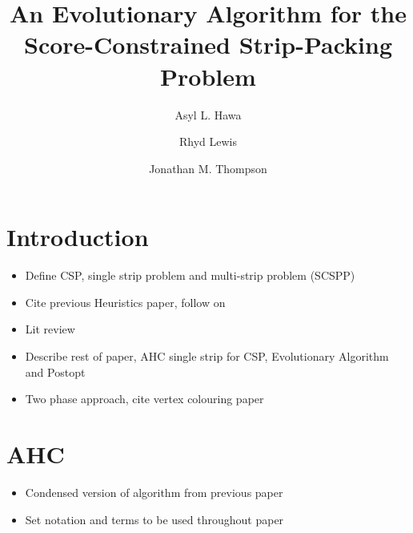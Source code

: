 \documentclass{elsarticle}
\begin{document}
	
\begin{frontmatter}
\title{An Evolutionary Algorithm for the Score-Constrained Strip-Packing Problem}
\author{Asyl L. Hawa}
\author{Rhyd Lewis}
\author{Jonathan M. Thompson}
\address{School of Mathematics, Cardiff University, Senghennydd Road, Cardiff, UK}

\begin{abstract}

\end{abstract}	

\end{frontmatter}


\section{Introduction}
\begin{itemize}
	\item Define CSP, single strip problem and multi-strip problem (SCSPP)
	\item Cite previous Heuristics paper, follow on
	\item Lit review
	\item Describe rest of paper, AHC single strip for CSP, Evolutionary Algorithm and Postopt
	\item Two phase approach, cite vertex colouring paper
\end{itemize}

\section{AHC}
\begin{itemize}
	\item Condensed version of algorithm from previous paper
	\item Set notation and terms to be used throughout paper
\end{itemize}
\end{document}
